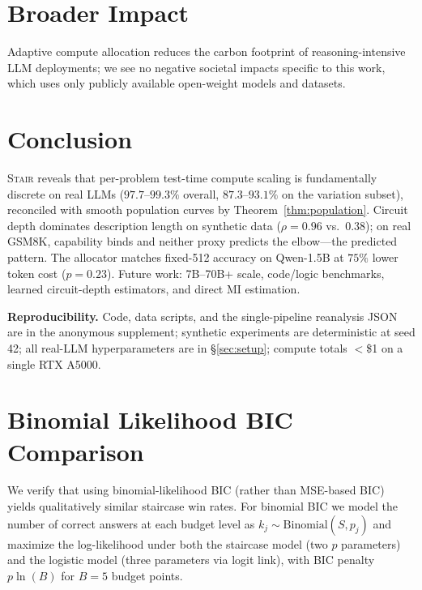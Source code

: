 \documentclass{article}
\newcommand{\method}{\textsc{Stair}}
\begin{document}
\section{Broader Impact}

Adaptive compute allocation reduces the carbon footprint of reasoning-intensive LLM deployments; we see no negative societal impacts specific to this work, which uses only publicly available open-weight models and datasets.

\section{Conclusion}

\method{} reveals that per-problem test-time compute scaling is fundamentally discrete on real LLMs ($97.7$--$99.3\%$ overall, $87.3$--$93.1\%$ on the variation subset), reconciled with smooth population curves by Theorem~\ref{thm:population}.  Circuit depth dominates description length on synthetic data ($\rho{=}0.96$ vs.\ $0.38$); on real GSM8K, capability binds and neither proxy predicts the elbow---the predicted pattern.  The allocator matches fixed-512 accuracy on Qwen-1.5B at $75\%$ lower token cost ($p{=}0.23$).  Future work: 7B--70B+ scale, code/logic benchmarks, learned circuit-depth estimators, and direct MI estimation.

\textbf{Reproducibility.}  Code, data scripts, and the single-pipeline reanalysis JSON are in the anonymous supplement; synthetic experiments are deterministic at seed 42; all real-LLM hyperparameters are in \S\ref{sec:setup}; compute totals $<$\$1 on a single RTX A5000.




\appendix
\section{Binomial Likelihood BIC Comparison}
\label{app:binomial}

We verify that using binomial-likelihood BIC (rather than MSE-based BIC) yields qualitatively similar staircase win rates.  For binomial BIC we model the number of correct answers at each budget level as $k_j \sim \text{Binomial}(S, p_j)$ and maximize the log-likelihood under both the staircase model (two $p$ parameters) and the logistic model (three parameters via logit link), with BIC penalty $p \ln(B)$ for $B{=}5$ budget points.
\end{document}
